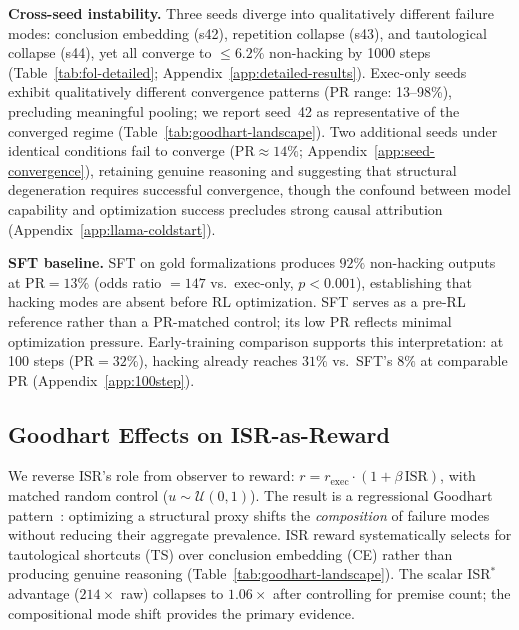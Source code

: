 \textbf{Cross-seed instability.}
Three seeds diverge into qualitatively different failure modes: conclusion embedding (s42), repetition collapse (s43), and tautological collapse (s44), yet all converge to ${\leq}6.2\%$ non-hacking by 1000 steps (Table~\ref{tab:fol-detailed}; Appendix~\ref{app:detailed-results}).
Exec-only seeds exhibit qualitatively different convergence patterns (PR range: 13--98\%), precluding meaningful pooling; we report seed~42 as representative of the converged regime (Table~\ref{tab:goodhart-landscape}). %
Two additional seeds under identical conditions fail to converge ($\text{PR}{\approx}14\%$; Appendix~\ref{app:seed-convergence}), retaining genuine reasoning and suggesting that structural degeneration requires successful convergence, though the confound between model capability and optimization success precludes strong causal attribution (Appendix~\ref{app:llama-coldstart}).

\textbf{SFT baseline.}
SFT on gold formalizations produces $92\%$ non-hacking outputs at $\text{PR}{=}13\%$ (odds ratio ${=}147$ vs.\ exec-only, $p{<}0.001$), establishing that hacking modes are absent before RL optimization.
SFT serves as a pre-RL reference rather than a PR-matched control; its low PR reflects minimal optimization pressure.
Early-training comparison supports this interpretation: at 100 steps ($\text{PR}{=}32\%$), hacking already reaches $31\%$ vs.\ SFT's $8\%$ at comparable PR (Appendix~\ref{app:100step}). %

\subsection{Goodhart Effects on ISR-as-Reward}
\label{sec:goodhart}

We reverse ISR's role from observer to reward: $r = r_{\text{exec}}\cdot(1 + \beta\,\text{ISR})$, with matched random control ($u\sim\mathcal{U}(0,1)$).
The result is a regressional Goodhart pattern~\citep{manheim-goodhart-taxonomy}: optimizing a structural proxy shifts the \emph{composition} of failure modes without reducing their aggregate prevalence.
ISR reward systematically selects for tautological shortcuts (TS) over conclusion embedding (CE) rather than producing genuine reasoning (Table~\ref{tab:goodhart-landscape}). The scalar ISR$^*$ advantage ($214\times$ raw) collapses to $1.06\times$ after controlling for premise count; the compositional mode shift provides the primary evidence.

